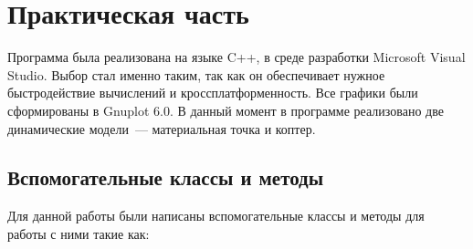 \documentclass[a4paper,12pt]{article}
\numberwithin{figure}{subsubsection}
\begin{document}
\newpage
\section{Практическая часть}
Программа была реализована на языке C++, в среде разработки Microsoft Visual Studio. Выбор стал именно таким, так как он обеспечивает нужное быстродействие вычислений и кроссплатформенность. Все графики были сформированы в Gnuplot 6.0. В данный момент в программе реализовано две динамические модели~--- материальная точка и коптер. 

\subsection{Вспомогательные классы и методы}
Для данной работы были написаны вспомогательные классы  и методы для работы с ними такие как:
\end{document}
